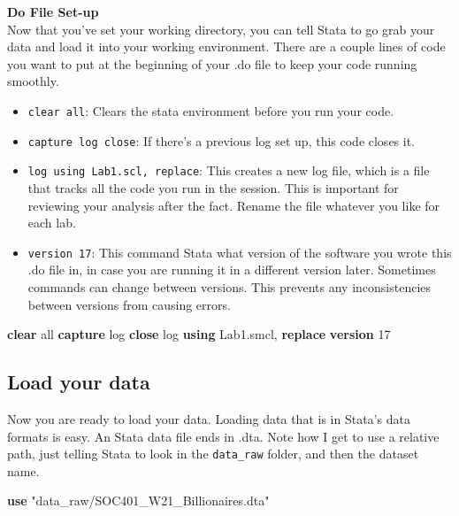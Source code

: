 \documentclass[
]{book}
\newenvironment{Shaded}{\begin{snugshade}}{\end{snugshade}}
\newcommand{\FunctionTok}[1]{\textcolor[rgb]{0.00,0.00,0.00}{#1}}
\newcommand{\KeywordTok}[1]{\textcolor[rgb]{0.13,0.29,0.53}{\textbf{#1}}}
\newcommand{\NormalTok}[1]{#1}
\newcommand{\OtherTok}[1]{\textcolor[rgb]{0.56,0.35,0.01}{#1}}
\newcommand{\StringTok}[1]{\textcolor[rgb]{0.31,0.60,0.02}{#1}}
\providecommand{\tightlist}{%
  \setlength{\itemsep}{0pt}\setlength{\parskip}{0pt}}
\begin{document}
\textbf{Do File Set-up}\\
Now that you've set your working directory, you can tell Stata to go grab your data and load it into your working environment.
There are a couple lines of code you want to put at the beginning of your .do file to keep your code running smoothly.

\begin{itemize}
\tightlist
\item
  \texttt{clear\ all}: Clears the stata environment before you run your code.
\item
  \texttt{capture\ log\ close}: If there's a previous log set up, this code closes it.
\item
  \texttt{log\ using\ Lab1.scl,\ replace}: This creates a new log file, which is a file that tracks all the code you run in the session. This is important for reviewing your analysis after the fact. Rename the file whatever you like for each lab.
\item
  \texttt{version\ 17}: This command Stata what version of the software you wrote this .do file in, in case you are running
  it in a different version later. Sometimes commands can change between versions. This prevents any inconsistencies between versions from causing errors.
\end{itemize}

\begin{Shaded}
\begin{Highlighting}[]
\KeywordTok{clear} \OtherTok{all} 
\KeywordTok{capture} \FunctionTok{log} \KeywordTok{close}
\FunctionTok{log} \KeywordTok{using}\NormalTok{ Lab1.smcl, }\KeywordTok{replace}
\KeywordTok{version}\NormalTok{ 17}
\end{Highlighting}
\end{Shaded}

\hypertarget{use}{%
\subsection{Load your data}\label{use}}

Now you are ready to load your data. Loading data that is in Stata's data formats is easy. An Stata data file ends in .dta. Note how I get to use a relative path, just telling Stata to look in the \texttt{data\_raw} folder, and then the dataset name.

\begin{Shaded}
\begin{Highlighting}[]
\KeywordTok{use} \StringTok{"data\_raw/SOC401\_W21\_Billionaires.dta"}
\end{Highlighting}
\end{Shaded}
\end{document}
